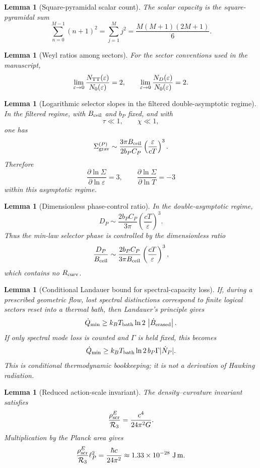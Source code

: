 \documentclass[11pt,a4paper]{article}
\newtheorem{lemma}[theorem]{Lemma}
\begin{document}
\begin{lemma}[Square-pyramidal scalar count]
The scalar capacity is the square-pyramidal sum
\[
\sum_{n=0}^{M-1}(n+1)^2
=
\sum_{j=1}^{M}j^2
=
\frac{M(M+1)(2M+1)}6.
\]
\end{lemma}

\begin{lemma}[Weyl ratios among sectors]
For the sector conventions used in the manuscript,
\[
\lim_{\varepsilon\to0}
\frac{N_{\rm TT}(\varepsilon)}{N_0(\varepsilon)}
=
2,
\qquad
\lim_{\varepsilon\to0}
\frac{N_D(\varepsilon)}{N_0(\varepsilon)}
=
2.
\]
\end{lemma}

\begin{lemma}[Logarithmic selector slopes in the filtered double-asymptotic regime]
In the filtered regime, with \(B_{\rm ceil}\) and \(b_P\) fixed, and with
\[
\tau\ll1,
\qquad
\chi\ll1,
\]
one has
\[
\Sigma_{\rm grav}^{(P)}
\sim
\frac{3\pi B_{\rm ceil}}{2b_PC_P}
\left(\frac{\varepsilon}{cT}\right)^3.
\]
Therefore
\[
\frac{\partial\ln\Sigma}{\partial\ln\varepsilon}=3,
\qquad
\frac{\partial\ln\Sigma}{\partial\ln T}=-3
\]
within this asymptotic regime.
\end{lemma}

\begin{lemma}[Dimensionless phase-control ratio]
In the double-asymptotic regime,
\[
D_P
\sim
\frac{2b_PC_P}{3\pi}
\left(\frac{cT}{\varepsilon}\right)^3.
\]
Thus the min-law selector phase is controlled by the dimensionless ratio
\[
\frac{D_P}{B_{\rm ceil}}
\sim
\frac{2b_PC_P}{3\pi B_{\rm ceil}}
\left(\frac{cT}{\varepsilon}\right)^3,
\]
which contains no \(R_{\rm curv}\).
\end{lemma}

\begin{lemma}[Conditional Landauer bound for spectral-capacity loss]
If, during a prescribed geometric flow, lost spectral distinctions correspond to finite logical sectors reset into a thermal bath, then Landauer's principle gives
\[
\dot Q_{\min}
\ge
k_BT_{\rm bath}\ln2\,
\left|\dot B_{\rm erased}\right|.
\]
If only spectral mode loss is counted and \(\Gamma\) is held fixed, this becomes
\[
\dot Q_{\min}
\ge
k_BT_{\rm bath}\ln2\, b_P\Gamma|\dot N_P|.
\]
This is conditional thermodynamic bookkeeping; it is not a derivation of Hawking radiation.
\end{lemma}

\begin{lemma}[Reduced action-scale invariant]
The density--curvature invariant satisfies
\[
\frac{\rho_{\rm scr}^E}{\mathcal R_3}
=
\frac{c^4}{24\pi^2G}.
\]
Multiplication by the Planck area gives
\[
\frac{\rho_{\rm scr}^E}{\mathcal R_3}\ell_P^2
=
\frac{\hbar c}{24\pi^2}
\approx
1.33\times10^{-28}\ {\rm J\,m}.
\]
\end{lemma}
\end{document}

